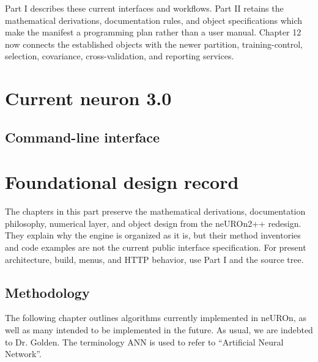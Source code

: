 \documentclass{report}
\begin{document}
Part I describes these current interfaces and workflows.  Part II retains the
mathematical derivations, documentation rules, and object specifications which
make the manifest a programming plan rather than a user manual.  Chapter 12 now
connects the established objects with the newer partition, training-control,
selection, covariance, cross-validation, and reporting services.

\part{Current neuron 3.0}



\chapter{Command-line interface}






\part{Foundational design record}

The chapters in this part preserve the mathematical derivations,
documentation philosophy, numerical layer, and object design from the
neUROn2++ redesign.  They explain why the engine is organized as it
is, but their method inventories and code examples are not the current
public interface specification.  For present architecture, build,
menus, and HTTP behavior, use Part I and the source tree.

\chapter{Methodology}

The following chapter outlines algorithms currently implemented in
neUROn, as well as many intended to be implemented in the future. As
usual, we are indebted to Dr. Golden. The terminology ANN is used to
refer to ``Artificial Neural Network''.
\end{document}
